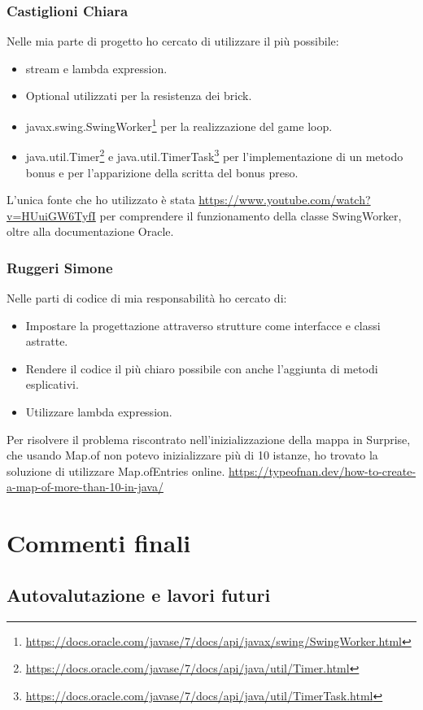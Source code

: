 \documentclass[a4paper,12pt]{report}
\begin{document}
\subsection{Castiglioni Chiara}
Nelle mia parte di progetto ho cercato di utilizzare il più possibile:
\begin{itemize}
    \item stream e lambda expression.
    \item Optional utilizzati per la resistenza dei brick.
    \item javax.swing.SwingWorker\footnote{\url{https://docs.oracle.com/javase/7/docs/api/javax/swing/SwingWorker.html}} per la realizzazione del game loop.
    \item java.util.Timer\footnote{\url{https://docs.oracle.com/javase/7/docs/api/java/util/Timer.html}} e java.util.TimerTask\footnote{\url{https://docs.oracle.com/javase/7/docs/api/java/util/TimerTask.html}} per l'implementazione di un metodo bonus e per l'apparizione della scritta del bonus preso.
\end{itemize}
L'unica fonte che ho utilizzato è stata {\url{https://www.youtube.com/watch?v=HUuiGW6TyfI}} per comprendere il funzionamento della
classe SwingWorker, oltre alla documentazione Oracle.
\subsection{Ruggeri Simone}
Nelle parti di codice di mia responsabilità ho cercato di:
\begin{itemize}
    \item Impostare la progettazione attraverso strutture come interfacce e classi astratte.
    \item Rendere il codice il più chiaro possibile con anche l'aggiunta di metodi esplicativi.
    \item Utilizzare lambda expression.
\end{itemize}
Per risolvere il problema riscontrato nell'inizializzazione della mappa in Surprise, che usando Map.of non potevo inizializzare più di
10 istanze, ho trovato la soluzione di utilizzare Map.ofEntries online. {\url{https://typeofnan.dev/how-to-create-a-map-of-more-than-10-in-java/}}

\chapter{Commenti finali}
\section{Autovalutazione e lavori futuri}
\end{document}
